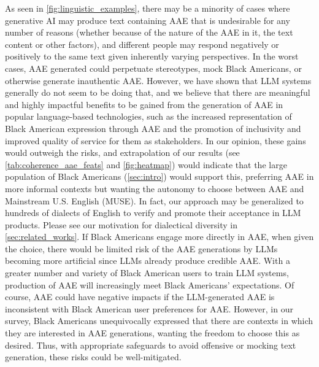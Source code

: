 As seen in \autoref{fig:linguistic_examples}, there may be a minority of cases where generative AI may produce text containing AAE that is undesirable for any number of reasons (whether because of the nature of the AAE in it, the text content or other factors), and different people may respond negatively or positively to the same text given inherently varying perspectives. In the worst cases, AAE generated could perpetuate stereotypes, mock Black Americans, or otherwise generate inauthentic AAE. However, we have shown that LLM systems generally do not seem to be doing that, and we believe that there are meaningful and highly impactful benefits to be gained from the generation of AAE in popular language-based technologies, such as the increased representation of Black American expression through AAE and the promotion of inclusivity and improved quality of service for them as stakeholders. In our opinion, these gains would outweigh the risks, and extrapolation of our results (see \autoref{tab:coherence_aae_feats} and \autoref{fig:heatmap}) would indicate that the large population of Black Americans (\autoref{sec:intro}) would support this, preferring AAE in more informal contexts but wanting the autonomy to choose between AAE and Mainstream U.S. English (MUSE). In fact, our approach may be generalized to hundreds of dialects of English to verify and promote their acceptance in LLM products. Please see our motivation for dialectical diversity in \autoref{sec:related_works}. If Black Americans engage more directly in AAE, when given the choice, there would be limited risk of the AAE generations by LLMs becoming more artificial since LLMs already produce credible AAE. With a greater number and variety of Black American users to train LLM systems, production of AAE will increasingly meet Black Americans’ expectations. Of course, AAE could have negative impacts if the LLM-generated AAE is inconsistent with Black American user preferences for AAE. However, in our survey, Black Americans unequivocally expressed that there are contexts in which they are interested in AAE generations, wanting the freedom to choose this as desired. Thus, with appropriate safeguards to avoid offensive or mocking text generation, these risks could be well-mitigated.


